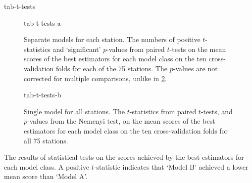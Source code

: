 {tab-t-tests}

\begin{table}
  \centering
  \begin{subfigure}{\textwidth}
    \centering
    {tab-t-tests-a}
    \caption{
      Separate models for each station.
      The numbers of positive $t$-statistics and `significant' $p$-values from paired
      $t$-tests on the mean scores of the best estimators for each model class on the ten
      cross-validation folds for each of the 75 stations.
      The $p$-values are not corrected for multiple comparisons, unlike in
      \cref{sub-task-1:tab-t-tests-b}.
    }
    \label{sub-task-1:tab-t-tests-a}
  \end{subfigure}
  \subfigurespace
  \begin{subfigure}{\textwidth}
    \centering
    {tab-t-tests-b}
    \caption{
      Single model for all stations.
      The $t$-statistics from paired $t$-tests, and $p$-values from the Nemenyi test, on the
      mean scores of the best estimators for each model class on the ten cross-validation
      folds for all 75 stations.
    }
    \label{sub-task-1:tab-t-tests-b}
  \end{subfigure}
  \caption{
    The results of statistical tests on the scores achieved by the best estimators for each model class.
    A positive $t$-statistic indicates that `Model B' achieved a lower mean score than
    `Model A'.
  }
  \label{sub-task-1:tab-t-tests}
\end{table}
